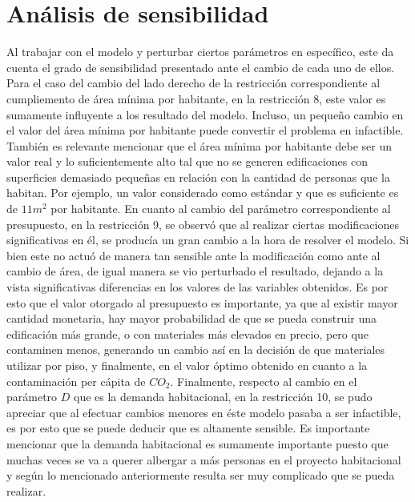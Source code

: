 \documentclass[letterpaper]{article}
\begin{document}
\section{Análisis de sensibilidad}
Al trabajar con el modelo y perturbar ciertos parámetros en específico, este da cuenta el grado de sensibilidad presentado ante el cambio de cada uno de ellos. Para el caso del cambio del lado derecho de la restricción 
correspondiente al cumpliemento de área mínima por habitante, en la restricción 8, este valor es sumamente influyente a los resultado del modelo. Incluso, un pequeño cambio en el valor del área mínima por habitante puede 
convertir el problema en infactible. También es relevante mencionar que el área mínima por habitante debe ser un valor real y lo suficientemente alto tal que no se generen edificaciones con superficies demasiado pequeñas 
en relación con la cantidad de personas que la habitan. Por ejemplo, un valor considerado como estándar y que es suficiente es de $11 m^2$ por habitante. En cuanto al cambio del parámetro correspondiente al presupuesto, 
en la restricción 9, se observó que al realizar ciertas modificaciones significativas en él, se producía un gran cambio a la hora de resolver el modelo. Si bien este no actuó de manera tan sensible ante la modificación 
como ante al cambio de área, de igual manera se vio perturbado el resultado, dejando a la vista significativas diferencias en los valores de las variables obtenidos. Es por esto que el valor otorgado al presupuesto
es importante, ya que al existir mayor cantidad monetaria, hay mayor probabilidad de que se pueda construir una edificación más grande, o con materiales más elevados en precio, pero que contaminen menos, generando
un cambio así en la decisión de que materiales utilizar por piso, y finalmente, en el valor óptimo obtenido en cuanto a la contaminación per cápita de $CO_2$. Finalmente, respecto al cambio en el parámetro $D$ que es la demanda 
habitacional, en la restricción 10, se pudo apreciar que al efectuar cambios menores en éste modelo pasaba a ser infactible, es por esto que se puede deducir que es altamente sensible. Es importante mencionar que la demanda 
habitacional es sumamente importante puesto que muchas veces se va a querer albergar a más personas en el proyecto habitacional y según lo mencionado anteriormente resulta ser muy complicado que se pueda realizar.\\
\end{document}
